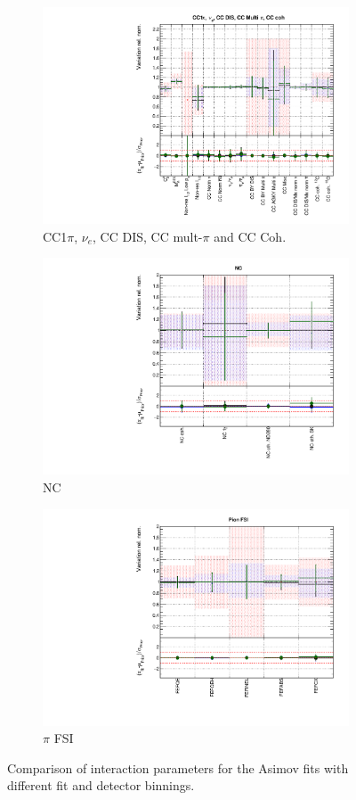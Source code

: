 \begin{figure}
\begin{subfigure}{0.49\textwidth}
  \centering
  \includegraphics[width=0.9\linewidth]{figs/polyasmvsxsec_3}
  \caption{CC1$\pi$, $\nu_e$, CC DIS, CC mult-$\pi$ and CC Coh.}
\end{subfigure}
\begin{subfigure}{0.49\textwidth}
  \centering
  \includegraphics[width=0.9\linewidth]{figs/polyasmvsxsec_4}
  \caption{NC}
\end{subfigure}
\begin{subfigure}{0.49\textwidth}
  \centering
  \includegraphics[width=0.9\linewidth]{figs/polyasmvsxsec_5}
  \caption{$\pi$ FSI}
\end{subfigure}
\caption{Comparison of interaction parameters for the Asimov fits with different fit and detector binnings.}
\label{fig:polyasmvsxsec}
\end{figure}

